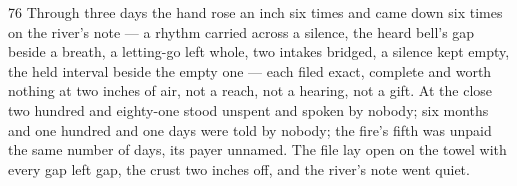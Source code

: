 \begin{CRchronicle}{76}
Through three days the hand rose an inch six times and came down six times on the river’s note --- a rhythm carried across a silence, the heard bell’s gap beside a breath, a letting-go left whole, two intakes bridged, a silence kept empty, the held interval beside the empty one --- each filed exact, complete and worth nothing at two inches of air, not a reach, not a hearing, not a gift. At the close two hundred and eighty-one stood unspent and spoken by nobody; six months and one hundred and one days were told by nobody; the fire’s fifth was unpaid the same number of days, its payer unnamed. The file lay open on the towel with every gap left gap, the crust two inches off, and the river’s note went quiet.
\end{CRchronicle}
